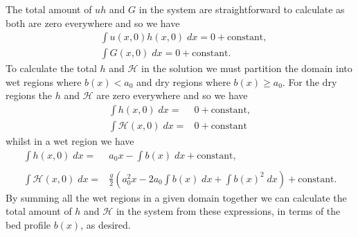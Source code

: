 The total amount of $uh$ and $G$ in the system are straightforward to calculate as both are zero everywhere and so we have 
\begin{align*}
&\int u(x,0)h(x,0) \;  dx = {} 0 + \text{constant}, \\
&\int G(x,0) \; dx = {} 0 + \text{constant}.
\end{align*}
To calculate the total $h$ and $\mathcal{H}$ in the solution we must partition the domain into wet regions where $b(x) < a_0$ and dry regions where $b(x) \ge a_0$. For the dry regions the $h$ and $\mathcal{H}$ are zero everywhere and so we have 
	\begin{align*}
	\int h(x,0) \; dx = {} & 0 + \text{constant} , \\
	\int \mathcal{H}(x,0) \; dx = {} & 0 + \text{constant}
	\end{align*}
whilst in a wet region we have 
\begin{subequations}
	\label{eqn:AppLARhwet}
	\begin{align}
	\int h(x,0) \; dx = {} & a_0 x -  \int b(x) \; dx  + \text{constant}, \\  \nonumber \\
	\int \mathcal{H}(x,0) \; dx = {} & \frac{g}{2} \left(a_0^2x  -  2a_0 \int b(x) \; dx + \int b(x)^2 \; dx \right) + \text{constant}.
	\end{align}
\end{subequations}
By summing all the wet regions in a given domain together we can calculate the total amount of $h$ and $\mathcal{H}$ in the system from these expressions, in terms of the bed profile $b(x)$, as desired. 
